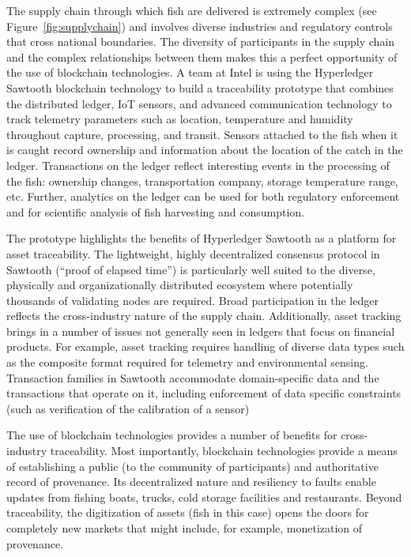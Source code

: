 The supply chain through which fish are delivered is extremely complex (see Figure~\ref{fig:supplychain})
and involves diverse industries and regulatory controls that cross national boundaries. The
diversity of participants in the supply chain and the complex relationships between them makes this
a perfect opportunity of the use of blockchain technologies. A team at Intel is using the
Hyperledger Sawtooth blockchain technology to build a traceability prototype that combines the
distributed ledger, IoT sensors, and advanced communication technology to track telemetry parameters
such as location, temperature and humidity throughout capture, processing, and transit. Sensors
attached to the fish when it is caught record ownership and information about the location of the
catch in the ledger. Transactions on the ledger reflect interesting events in the processing of the
fish: ownership changes, transportation company, storage temperature range, etc. Further, analytics
on the ledger can be used for both regulatory enforcement and for scientific analysis of fish
harvesting and consumption.

The prototype highlights the benefits of Hyperledger Sawtooth as a platform for asset
traceability. The lightweight, highly decentralized consensus protocol in Sawtooth (``proof of
elapsed time'') is particularly well suited to the diverse, physically and organizationally
distributed ecosystem where potentially thousands of validating nodes are required. Broad
participation in the ledger reflects the cross-industry nature of the supply chain. Additionally,
asset tracking brings in a number of issues not generally seen in ledgers that focus on financial
products. For example, asset tracking requires handling of diverse data types such as the composite
format required for telemetry and environmental sensing. Transaction families in Sawtooth
accommodate domain-specific data and the transactions that operate on it, including enforcement of
data specific constraints (such as verification of the calibration of a sensor)

The use of blockchain technologies provides a number of benefits for cross-industry
traceability. Most importantly, blockchain technologies provide a means of establishing a public (to
the community of participants) and authoritative record of provenance. Its decentralized nature and
resiliency to faults enable updates from fishing boats, trucks, cold storage facilities and
restaurants. Beyond traceability, the digitization of assets (fish in this case) opens the doors for
completely new markets that might include, for example, monetization of provenance.
